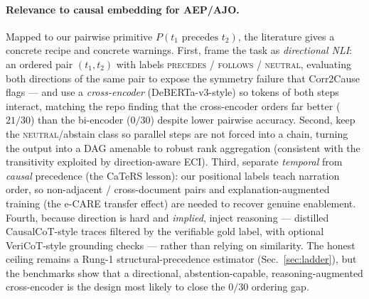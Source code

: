 \paragraph{Relevance to causal embedding for AEP/AJO.}
Mapped to our pairwise primitive $P(t_1 \text{ precedes } t_2)$, the literature
gives a concrete recipe and concrete warnings. First, frame the task as
\emph{directional NLI}: an ordered pair $(t_1,t_2)$ with labels
\textsc{precedes} / \textsc{follows} / \textsc{neutral}, evaluating both
directions of the same pair to expose the symmetry failure that Corr2Cause flags
--- and use a \emph{cross-encoder} (DeBERTa-v3-style) so tokens of both steps
interact, matching the repo finding that the cross-encoder orders far better
($21/30$) than the bi-encoder ($0/30$) despite lower pairwise accuracy. Second,
keep the \textsc{neutral}/abstain class so parallel steps are not forced into a
chain, turning the output into a DAG amenable to robust rank aggregation
(consistent with the transitivity exploited by direction-aware ECI). Third,
separate \emph{temporal} from \emph{causal} precedence (the CaTeRS lesson): our
positional labels teach narration order, so non-adjacent / cross-document pairs
and explanation-augmented training (the e-CARE transfer effect) are needed to
recover genuine enablement. Fourth, because direction is hard and \emph{implied},
inject reasoning --- distilled CausalCoT-style traces filtered by the verifiable
gold label, with optional VeriCoT-style grounding checks --- rather than relying
on similarity. The honest ceiling remains a Rung-1 structural-precedence
estimator (Sec.~\ref{sec:ladder}), but the benchmarks show that a directional,
abstention-capable, reasoning-augmented cross-encoder is the design most likely
to close the $0/30$ ordering gap.
